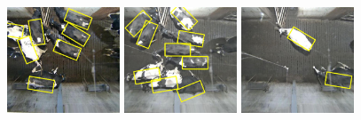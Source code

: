 \documentclass[10pt,a4paper,twocolumn]{article}
\begin{document}
\begin{figure}[tb]
\begin{center}
  \includegraphics[width=0.3\textwidth]{ok/1419422172315416.jpg}
  \includegraphics[width=0.3\textwidth]{ok/1419630968631761.jpg}
  \includegraphics[width=0.3\textwidth]{ok/1420251135794580.jpg}

\vspace{1mm}


\end{center}
\end{figure}
\end{document}
